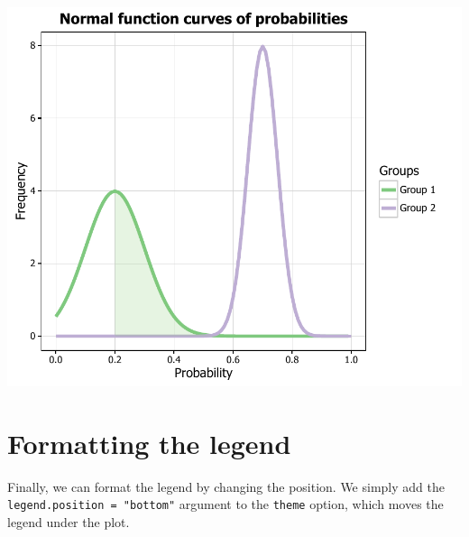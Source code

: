 \begin{Shaded}
\begin{Highlighting}[]
\StringTok{ }
    \StringTok{ } \NormalTok{, } \NormalTok{)}
    \NormalTok{y[x <}\StringTok{ } \NormalTok{|}\StringTok{ }\StringTok{ }\NormalTok{(} \NormalTok{+}\StringTok{ } \NormalTok{*}\StringTok{ }\NormalTok{)] <-}\StringTok{ }
\NormalTok{\}}

\StringTok{ }\StringTok{ }\NormalTok{(}\NormalTok{, }\NormalTok{, }\NormalTok{)}
\end{Highlighting}
\end{Shaded}

\begin{center}\includegraphics[width=0.6\linewidth]{9_Function_Plots_pdf/function_18-1} \end{center}

\section{Formatting the legend}\label{formatting-the-legend}

Finally, we can format the legend by changing the position. We simply
add the \texttt{legend.position\ =\ "bottom"} argument to the
\texttt{theme} option, which moves the legend under the plot.

